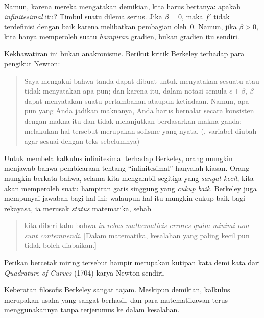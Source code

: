 \documentclass[../../../include/open-logic-section]{subfiles}
\begin{document}
Namun, karena mereka mengatakan demikian, kita harus bertanya: apakah
\emph{infinitesimal} itu? Timbul suatu dilema serius. Jika $\beta=0$, maka
$f'$ tidak terdefinisi dengan baik karena melibatkan pembagian oleh~$0$.
Namun, jika $\beta>0$, kita hanya memperoleh suatu \emph{hampiran} gradien,
bukan gradien itu sendiri.

Kekhawatiran ini bukan anakronisme. Berikut kritik Berkeley terhadap para
pengikut Newton:
\begin{quote}
Saya mengakui bahwa tanda dapat dibuat untuk menyatakan sesuatu atau tidak
menyatakan apa pun; dan karena itu, dalam notasi semula $c+\beta$, $\beta$
dapat menyatakan suatu pertambahan ataupun ketiadaan. Namun, apa pun yang
Anda jadikan maknanya, Anda harus bernalar secara konsisten dengan makna itu
dan tidak melanjutkan berdasarkan makna ganda; melakukan hal tersebut
merupakan sofisme yang nyata. (\citealt[\S{}XIII]{Berkeley1734},
variabel diubah agar sesuai dengan teks sebelumnya)
\end{quote}
Untuk membela kalkulus infinitesimal terhadap Berkeley, orang mungkin
menjawab bahwa pembicaraan tentang ``infinitesimal'' hanyalah kiasan.
Orang mungkin berkata bahwa, selama kita mengambil segitiga yang
\emph{sangat kecil}, kita akan memperoleh suatu hampiran garis singgung yang
\emph{cukup baik}. Berkeley juga mempunyai jawaban bagi hal ini: walaupun
hal itu mungkin cukup baik bagi rekayasa, ia merusak \emph{status}
matematika, sebab
\begin{quote}
kita diberi tahu bahwa \emph{in rebus mathematicis errores qu\`{a}m minimi
non sunt contemnendi}. [Dalam matematika, kesalahan yang paling kecil pun
tidak boleh diabaikan.] \citep[\S{}IX]{Berkeley1734}
\end{quote}
Petikan bercetak miring tersebut hampir merupakan kutipan kata demi kata
dari \emph{Quadrature of Curves} (1704) karya Newton sendiri.

Keberatan filosofis Berkeley sangat tajam. Meskipun demikian, kalkulus
merupakan usaha yang sangat berhasil, dan para matematikawan terus
menggunakannya tanpa terjerumus ke dalam kesalahan.
\end{document}
